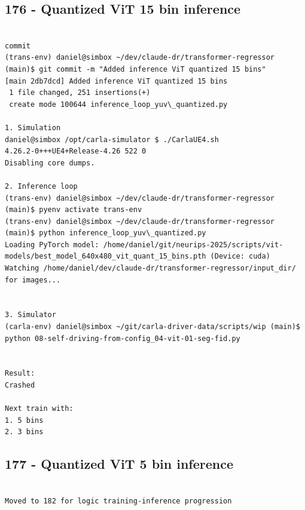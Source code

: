 \subsection{176 - Quantized ViT 15 bin inference}
\label{app_res:176}

\begin{verbatim}

commit
(trans-env) daniel@simbox ~/dev/claude-dr/transformer-regressor (main)$ git commit -m "Added inference ViT quantized 15 bins"
[main 2db7dcd] Added inference ViT quantized 15 bins
 1 file changed, 251 insertions(+)
 create mode 100644 inference_loop_yuv\_quantized.py
 
1. Simulation
daniel@simbox /opt/carla-simulator $ ./CarlaUE4.sh 
4.26.2-0+++UE4+Release-4.26 522 0
Disabling core dumps.

2. Inference loop
(trans-env) daniel@simbox ~/dev/claude-dr/transformer-regressor (main)$ pyenv activate trans-env
(trans-env) daniel@simbox ~/dev/claude-dr/transformer-regressor (main)$ python inference_loop_yuv\_quantized.py 
Loading PyTorch model: /home/daniel/git/neurips-2025/scripts/vit-models/best_model_640x480_vit_quant_15_bins.pth (Device: cuda)
Watching /home/daniel/dev/claude-dr/transformer-regressor/input_dir/ for images...


3. Simulator
(carla-env) daniel@simbox ~/git/carla-driver-data/scripts/wip (main)$ python 08-self-driving-from-config_04-vit-01-seg-fid.py 


Result:
Crashed

Next train with:
1. 5 bins
2. 3 bins

\end{verbatim}

\subsection{177 - Quantized ViT 5 bin inference}
\label{app_res:177}

\begin{verbatim}

Moved to 182 for logic training-inference progression

\end{verbatim}


